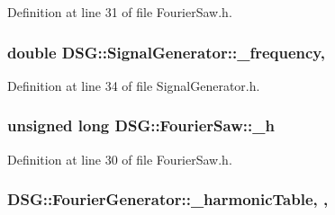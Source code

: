 Definition at line 31 of file Fourier\+Saw.\+h.

\hypertarget{classDSG_1_1SignalGenerator_a67e296e3506dcdf09402c667cddff9ac}{
\subsubsection[{\+\_\+frequency}]{\setlength{\rightskip}{0pt plus 5cm}double D\+S\+G\+::\+Signal\+Generator\+::\+\_\+frequency\hspace{0.3cm}{\ttfamily [protected]}, {\ttfamily [inherited]}}}\label{classDSG_1_1SignalGenerator_a67e296e3506dcdf09402c667cddff9ac}


Definition at line 34 of file Signal\+Generator.\+h.

\hypertarget{classDSG_1_1FourierSaw_afaa437e6dda9ddbd4f011012dfe3c55a}{
\subsubsection[{\+\_\+h}]{\setlength{\rightskip}{0pt plus 5cm}unsigned long D\+S\+G\+::\+Fourier\+Saw\+::\+\_\+h\hspace{0.3cm}{\ttfamily [protected]}}}\label{classDSG_1_1FourierSaw_afaa437e6dda9ddbd4f011012dfe3c55a}


Definition at line 30 of file Fourier\+Saw.\+h.

\hypertarget{classDSG_1_1FourierGenerator_aedac2cf90997418836d064c90540249d}{
\subsubsection[{\+\_\+harmonic\+Table}]{ D\+S\+G\+::\+Fourier\+Generator\+::\+\_\+harmonic\+Table\hspace{0.3cm}{\ttfamily [static]}, {\ttfamily [protected]}, {\ttfamily [inherited]}}}\label{classDSG_1_1FourierGenerator_aedac2cf90997418836d064c90540249d}


